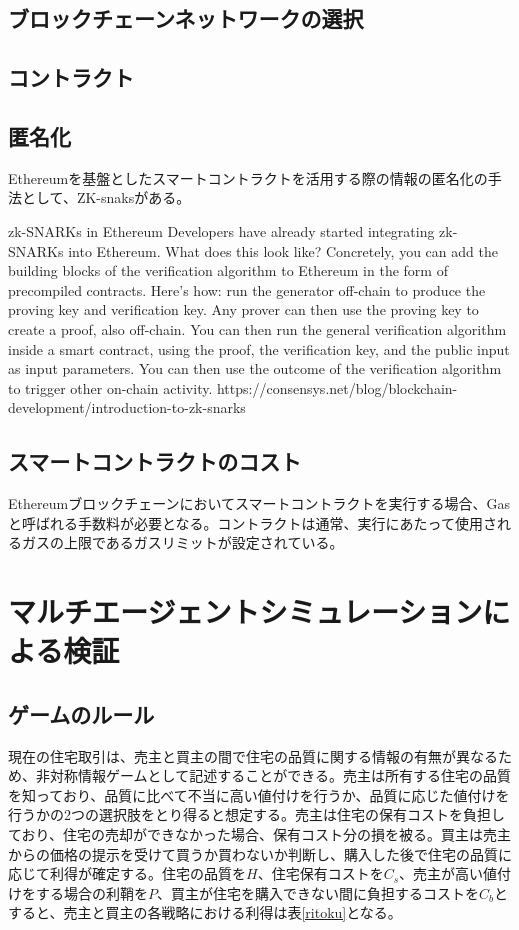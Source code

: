 \documentclass[a4paper,11pt]{jlreq}
\begin{document}
\subsection{ブロックチェーンネットワークの選択}


\subsection{コントラクト}

\subsection{匿名化}
Ethereumを基盤としたスマートコントラクトを活用する際の情報の匿名化の手法として、ZK-snaksがある。

zk-SNARKs in Ethereum
Developers have already started integrating zk-SNARKs into Ethereum. What does this look like? Concretely, you can add the building blocks of the verification algorithm to Ethereum in the form of precompiled contracts. Here’s how: run the generator off-chain to produce the proving key and verification key. Any prover can then use the proving key to create a proof, also off-chain. You can then run the general verification algorithm inside a smart contract, using the proof, the verification key, and the public input as input parameters. You can then use the outcome of the verification algorithm to trigger other on-chain activity.
https://consensys.net/blog/blockchain-development/introduction-to-zk-snarks
\subsection{スマートコントラクトのコスト}
Ethereumブロックチェーンにおいてスマートコントラクトを実行する場合、Gasと呼ばれる手数料が必要となる。コントラクトは通常、実行にあたって使用されるガスの上限であるガスリミットが設定されている。

\section{マルチエージェントシミュレーションによる検証}
\subsection{ゲームのルール}
現在の住宅取引は、売主と買主の間で住宅の品質に関する情報の有無が異なるため、非対称情報ゲームとして記述することができる。売主は所有する住宅の品質を知っており、品質に比べて不当に高い値付けを行うか、品質に応じた値付けを行うかの2つの選択肢をとり得ると想定する。売主は住宅の保有コストを負担しており、住宅の売却ができなかった場合、保有コスト分の損を被る。買主は売主からの価格の提示を受けて買うか買わないか判断し、購入した後で住宅の品質に応じて利得が確定する。住宅の品質を$H$、住宅保有コストを$C_s$、売主が高い値付けをする場合の利鞘を$P$、買主が住宅を購入できない間に負担するコストを$C_b$とすると、売主と買主の各戦略における利得は表\ref{ritoku}となる。
\end{document}
